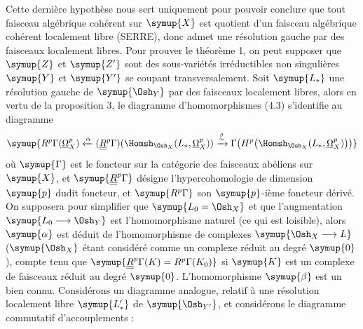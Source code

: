Cette dernière hypothèse nous sert uniquement pour pouvoir conclure que tout
faisceau algébrique cohérent sur $\symup{X}$ est quotient d'un faisceau algébrique
cohérent localement libre (SERRE), donc admet une résolution gauche par des
faisceaux localement libres. Pour prouver le théorème 1, on peut supposer que
$\symup{Z}$ et $\symup{Z'}$ sont des sous-variétés irréductibles non singulières $\symup{Y}$ et $\symup{Y'}$ se
coupant transversalement. Soit $\symup{L_{*}}$ une résolution gauche de $\symup{\Osh_Y}$ par des
faisceaux localement libres, alors en vertu de la proposition 3, le diagramme
d'homomorphismes (4.3) s'identifie au diagramme
\[
\symup{R^{p}\Gamma(\underline{\Omega}_X^{p})
\xleftarrow{\alpha}
(\underline{\underline{R}}^{p}\Gamma)\!\left(\Homsh_{\Osh_X}(L_{*},\underline{\Omega}_X^{p})\right)
\xrightarrow{\overset{\beta}{\sim}}
\Gamma\!\left(H^{p}\bigl(\Homsh_{\Osh_X}(L_{*},\underline{\Omega}_X^{p})\bigr)\right)}
\]
où $\symup{\Gamma}$ est le foncteur  sur la catégorie des
faisceaux abéliens sur $\symup{X}$, et $\symup{\underline{\underline{R}}^{p}\Gamma}$ désigne
l'hypercohomologie de dimension $\symup{p}$ dudit foncteur, et $\symup{R^{p}\Gamma}$ son
$\symup{p}$-ième foncteur dérivé. On supposera pour simplifier que $\symup{L_0=\Osh_X}$ et que
l'augmentation $\symup{L_0\longrightarrow\Osh_Y}$ est l'homomorphisme naturel (ce qui
est loisible), alors $\symup{\alpha}$ est déduit de l'homomorphisme de complexes
$\symup{\Osh_X\longrightarrow L}$ ($\symup{\Osh_X}$ étant considéré comme un complexe réduit
au degré $\symup{0}$), compte tenu que $\symup{\underline{\underline{R}}^{p}\Gamma(K)=R^{p}\Gamma(K_0)}$ si $\symup{K}$
est un complexe de faisceaux réduit au degré $\symup{0}$. L'homomorphisme $\symup{\beta}$ est un
 bien connu. Considérons un diagramme analogue, relatif à
une résolution localement libre $\symup{L'_{*}}$ de $\symup{\Osh_{Y'}}$, et considérons le
diagramme commutatif d'accouplements :
